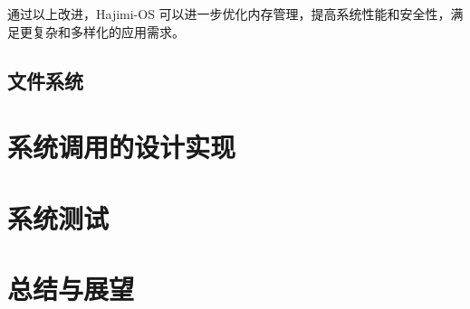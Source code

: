 \documentclass[UTF8]{article}
\begin{document}
通过以上改进，Hajimi-OS 可以进一步优化内存管理，提高系统性能和安全性，满足更复杂和多样化的应用需求。

\subsection{文件系统}

\section{系统调用的设计实现}

\section{系统测试}

\section{总结与展望}



\end{document}
